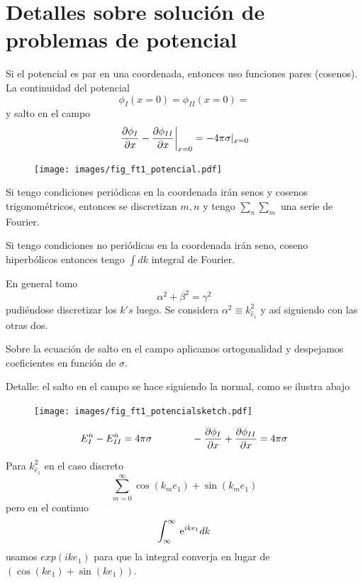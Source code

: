 \documentclass[10pt,oneside]{CBFT_book}
\begin{document}
\section{Detalles sobre solución de problemas de potencial}

Si el potencial es par en una coordenada, entonces uso funciones pares (cosenos). 
La continuidad del potencial
\[
	\phi_I(x=0) = \phi_{II}(x=0) = 
\]
y salto en el campo
\[
	\left.\frac{\partial^{\hspace{-0.05em}} {\phi_I}}{\partial {x}^{\hspace{-0.05em}}} - \frac{\partial^{\hspace{-0.05em}} {\phi_{II}}}{\partial {x}^{\hspace{-0.05em}}}\right|_{x=0} = -4\pi\sigma|_{x=0}
\]

\begin{figure}[htb]
	\begin{center}
	\texttt{[image: images/fig\_ft1\_potencial.pdf]}	 
	\end{center}
	\caption{}
\end{figure} 
Si tengo condiciones periódicas en la coordenada irán senos y cosenos trigonométricos, entonces se
discretizan $m,n$ y tengo $\sum_n \sum_m$ una serie de Fourier.

Si tengo condiciones no periódicas en la coordenada irán seno, coseno hiperbólicos entonces tengo
$\int dk$ integral de Fourier.

En general tomo
\[
	\alpha^2 + \beta^2 = \gamma^2
\]
pudiéndose discretizar los $k's$ luego. Se considera $\alpha^2 \equiv k_{\hat{e}_1}^2$ y así siguiendo
con las otras dos.

Sobre la ecuación de salto en el campo aplicamos ortogonalidad y despejamos coeficientes en función
de $\sigma$.

Detalle: el salto en el campo se hace siguiendo la normal, como se ilustra abajo
\begin{figure}[htb]
	\begin{center}
	\texttt{[image: images/fig\_ft1\_potencialsketch.pdf]}
	\end{center}
	\caption{}
\end{figure} 
\[
	E_I^{\hat{n}} - E_{II}^{\hat{n}} = 4 \pi \sigma \qquad\qquad 
	- \frac{\partial^{\hspace{-0.05em}} {\phi_I}}{\partial {x}^{\hspace{-0.05em}}} + \frac{\partial^{\hspace{-0.05em}} {\phi_{II}}}{\partial {x}^{\hspace{-0.05em}}} = 4 \pi \sigma
\]

Para $k_{\hat{e}_1}^2$ en el caso discreto
\[
	\sum_{m=0}^\infty \cos(k_m e_1) + \sin(k_m e_1)
\]
pero en el continuo 
\[
	\int_{\infty}^{\infty} \:\mathrm{e}^{ike_1} dk
\]
usamos $exp(ike_1)$ para que la integral converja en lugar de $(\cos(ke_1) + \sin(ke_1))$.
\end{document}
